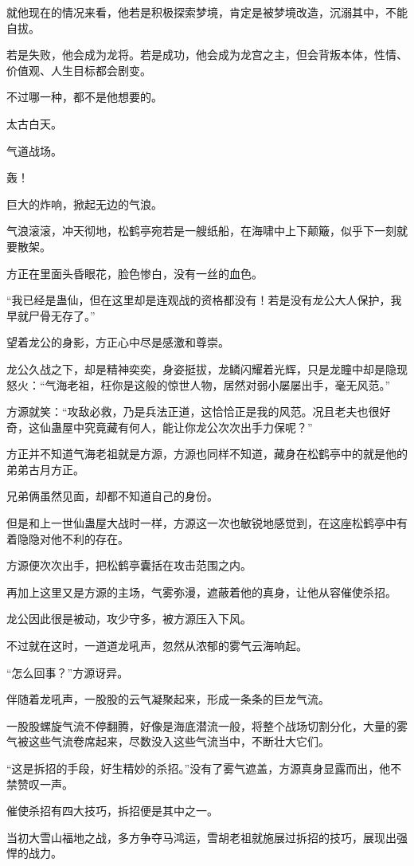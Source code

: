 \begin{this_body}
就他现在的情况来看，他若是积极探索梦境，肯定是被梦境改造，沉溺其中，不能自拔。

若是失败，他会成为龙将。若是成功，他会成为龙宫之主，但会背叛本体，性情、价值观、人生目标都会剧变。

不过哪一种，都不是他想要的。

太古白天。

气道战场。

轰！

巨大的炸响，掀起无边的气浪。

气浪滚滚，冲天彻地，松鹤亭宛若是一艘纸船，在海啸中上下颠簸，似乎下一刻就要散架。

方正在里面头昏眼花，脸色惨白，没有一丝的血色。

“我已经是蛊仙，但在这里却是连观战的资格都没有！若是没有龙公大人保护，我早就尸骨无存了。”

望着龙公的身影，方正心中尽是感激和尊崇。

龙公久战之下，却是精神奕奕，身姿挺拔，龙鳞闪耀着光辉，只是龙瞳中却是隐现怒火：“气海老祖，枉你是这般的惊世人物，居然对弱小屡屡出手，毫无风范。”

方源就笑：“攻敌必救，乃是兵法正道，这恰恰正是我的风范。况且老夫也很好奇，这仙蛊屋中究竟藏有何人，能让你龙公次次出手力保呢？”

方正并不知道气海老祖就是方源，方源也同样不知道，藏身在松鹤亭中的就是他的弟弟古月方正。

兄弟俩虽然见面，却都不知道自己的身份。

但是和上一世仙蛊屋大战时一样，方源这一次也敏锐地感觉到，在这座松鹤亭中有着隐隐对他不利的存在。

方源便次次出手，把松鹤亭囊括在攻击范围之内。

再加上这里又是方源的主场，气雾弥漫，遮蔽着他的真身，让他从容催使杀招。

龙公因此很是被动，攻少守多，被方源压入下风。

不过就在这时，一道道龙吼声，忽然从浓郁的雾气云海响起。

“怎么回事？”方源讶异。

伴随着龙吼声，一股股的云气凝聚起来，形成一条条的巨龙气流。

一股股螺旋气流不停翻腾，好像是海底潜流一般，将整个战场切割分化，大量的雾气被这些气流卷席起来，尽数没入这些气流当中，不断壮大它们。

“这是拆招的手段，好生精妙的杀招。”没有了雾气遮盖，方源真身显露而出，他不禁赞叹一声。

催使杀招有四大技巧，拆招便是其中之一。

当初大雪山福地之战，多方争夺马鸿运，雪胡老祖就施展过拆招的技巧，展现出强悍的战力。


\end{this_body}
